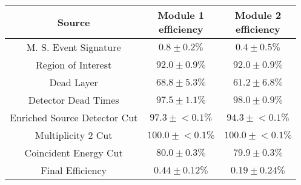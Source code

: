 \begin{tabular}{|c|c|c|}
\hline
  Source & \makecell{Module 1\\efficiency} & \makecell{Module 2\\efficiency} \\
\hline
  M. S. Event Signature & $0.8 \pm 0.2\%$ & $0.4 \pm 0.5\%$ \\
  Region of Interest & $92.0 \pm 0.9\%$ & $92.0 \pm 0.9\%$ \\
  Dead Layer & $68.8 \pm 5.3\%$ & $61.2 \pm 6.8\%$ \\
  Detector Dead Times & $97.5 \pm 1.1\%$ & $98.0 \pm 0.9\%$ \\
  Enriched Source Detector Cut & $97.3 \pm{}<\!0.1\%$ & $94.3 \pm{}<\!0.1\%$ \\
  Multiplicity 2 Cut & $100.0 \pm{}<\!0.1\%$ & $100.0 \pm{}<\!0.1\%$ \\
  Coincident Energy Cut & $80.0 \pm 0.3\%$ & $79.9 \pm 0.3\%$ \\
  \hline Final Efficiency & $0.44 \pm 0.12\%$ & $0.19 \pm 0.24\%$ \\
\hline
\end{tabular}

